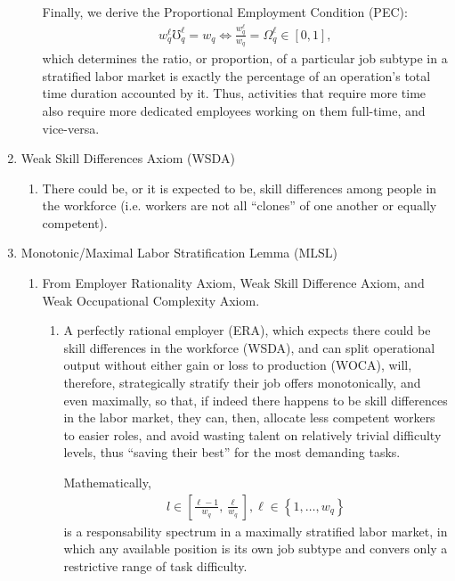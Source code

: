 \documentclass[hidelinks, nonatbib]{elsarticle}
\begin{document}
\begin{enumerate}
\begin{enumerate}
        Finally, we derive the Proportional Employment Condition (PEC):
        \begin{gather}
            w_{q}^{\ell}
            \mho_{q}^{\ell}
            =
            w_q
            \iff
            \frac{
                w_{q}^{\ell}
            }{
                w_q
            }
            =
            \Omega_{q}^{\ell}
            \in [0,1]
            ,
        \end{gather}
        which determines the ratio, or proportion, of a particular job subtype in a stratified labor market is exactly the percentage of an operation's total time duration accounted by it. Thus, activities that require more time also require more dedicated employees working on them full-time, and vice-versa.
    \end{enumerate}
    \item Weak Skill Differences Axiom (WSDA)
    \begin{enumerate}
        \item There could be, or it is expected to be, skill differences among people in the workforce (i.e. workers are not all ``clones'' of one another or equally competent).
    \end{enumerate}
    \item Monotonic/Maximal Labor Stratification Lemma (MLSL)
    \begin{enumerate}
        \item From Employer Rationality Axiom, Weak Skill Difference Axiom, and Weak Occupational Complexity Axiom.
        \begin{enumerate}
            \item A perfectly rational employer (ERA), which expects there could be skill differences in the workforce (WSDA), and can split operational output without either gain or loss to production (WOCA), will, therefore, strategically stratify their job offers monotonically, and even maximally, so that, if indeed there happens to be skill differences in the labor market, they can, then, allocate less competent workers to easier roles, and avoid wasting talent on relatively trivial difficulty levels, thus ``saving their best'' for the most demanding tasks.
            
            Mathematically,
            \begin{gather}
                l \in \left[
                \frac{\ell - 1}{w_q}
                ,
                \frac{\ell}{w_q}
                \right]
                ,
                \ell \in 
                \left\{
                    1, \dots, w_q
                \right\}
            \end{gather}
            is a responsability spectrum in a maximally stratified labor market, in which any available position is its own job subtype and convers only a restrictive range of task difficulty.


\end{enumerate}
\end{enumerate}
\end{enumerate}
\end{document}
